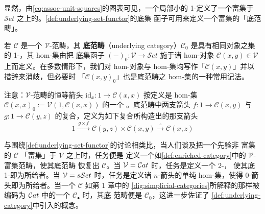 \begin{definition}
\begin{center}
\end{center}
\end{definition}

显然，由\eqref{eq:assoc-unit-squares}的图表可见，一个局部小的 1-\trCategory{}定义了一个富集于
$\mathcal{S}et$ 之上的\trCategory。\cref{def:underlying-set-functor}的底集
函子可用来定义一个富集\trCategory{}的「底范畴」。

\begin{definition}\label{def:underlying-category}
若 $\mathcal{C}$ 是一个 $\mathcal{V}$-范畴，其 \textbf{底范畴}（underlying
category）$\mathcal{C}_{0}$ 是具有相同对象之集的 1-\trCategory，其 hom-集由把
底集函子 $(-)_{0}\colon\mathcal{V}\to\mathcal{S}et$ 施于诸 hom-对象
$\mathcal{C}(x,y)\in\mathcal{V}$ 上而定义。在多数情形下，我们对 hom-对象与
hom-集均写作「$\mathcal{C}(x,y)$」并以措辞来消歧，但必要时
「$\mathcal{C}(x,y)_{0}$」也是底范畴之 hom-集的一种常用记法。
\end{definition}

注意：$\mathcal{V}$-范畴的恒等箭头 $\mathrm{id}_{x}\colon 1\to\mathcal{C}(x,x)$
按定义是 hom-集 $\mathcal{C}(x,x)_{0}:=\mathcal{V}(1,\mathcal{C}(x,x))$ 的一个%
\trElement。底范畴中两支箭头 $f\colon 1\to\mathcal{C}(x,y)$ 与
$g\colon 1\to\mathcal{C}(y,z)$ 的复合，定义为如下复合所构造出的那支箭头
\[ 1\xrightarrow{\ g\times f\ }\mathcal{C}(y,z)\times\mathcal{C}(x,y)
   \xrightarrow{\ \circ\ }\mathcal{C}(x,z) \]

与围绕\cref{def:underlying-set-functor}的讨论相类比，当人们谈及把一个先验非
富集的\trCategory{} $\mathcal{C}$ 「富集」于 $\mathcal{V}$ 之上时，任务便是
定义一个如\cref{def:enriched-category}中的 $\mathcal{V}$-富集范畴，使其底范畴
恢复出 $\mathcal{C}$。当 $\mathcal{V}=\mathcal{C}at$ 时，任务是定义一个 2-\trCategory，
使其底 1-\trCategory{}即为所给者。当 $\mathcal{V}=s\mathcal{S}et$ 时，任务是定义诸
$n$-箭头的单纯 hom-集，使得 0-箭头即为所给者。当一个%
\trSimpliciallyEnrichedCategory{} $\mathcal{C}$ 如第 1 章中的%
\cref{dig:simplicial-categories}所解释的那样被
编码为 $\mathcal{C}at$ 中的一个\trSimplicialObject{} $\mathcal{C}_{\bullet}$ 时，其底
范畴便是\trCategory{} $\mathcal{C}_{0}$，这进一步佐证了%
\cref{def:underlying-category}中引入的概念。

